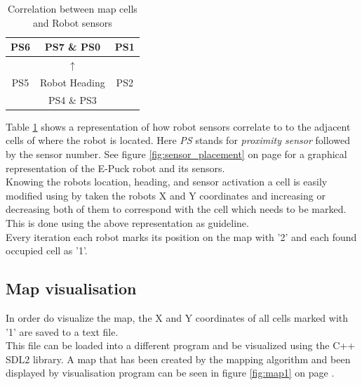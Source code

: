 \begin{table}[h]
\begin{center}
\begin{tabular}{c | c | c}
PS6 & PS7 \& PS0 & PS1 \\\hline
 & $\uparrow$ & \\
PS5 & Robot Heading & PS2 \\\hline
 & PS4 \& PS3 & 
\end{tabular}
\caption{Correlation between map cells and Robot sensors}
\label{tab:cells}
\end{center}
\end{table}

Table \ref{tab:cells} shows a representation of how robot sensors correlate to to the adjacent cells of where the robot is located. Here \textit{PS} stands for \textit{proximity sensor} followed by the sensor number. See figure \ref{fig:sensor_placement} on page \pageref{fig:sensor_placement} for a graphical representation of the E-Puck robot and its sensors.  \\
Knowing the robots location, heading, and sensor activation a cell is easily modified using by taken the robots X and Y coordinates and increasing or decreasing both of them to correspond with the cell which needs to be marked. This is done using the above representation as guideline. \\
Every iteration each robot marks its position on the map with '2' and each found occupied cell as '1'.\\

\subsection{Map visualisation}
In order do visualize the map, the X and Y coordinates of all cells marked with '1' are saved to a text file.\\
This file can be loaded into a different program and be visualized using the C++ SDL2 library.
A map that has been created by the mapping algorithm and been displayed by visualisation program can be seen in figure \ref{fig:map1} on page \pageref{fig:map1}. 
